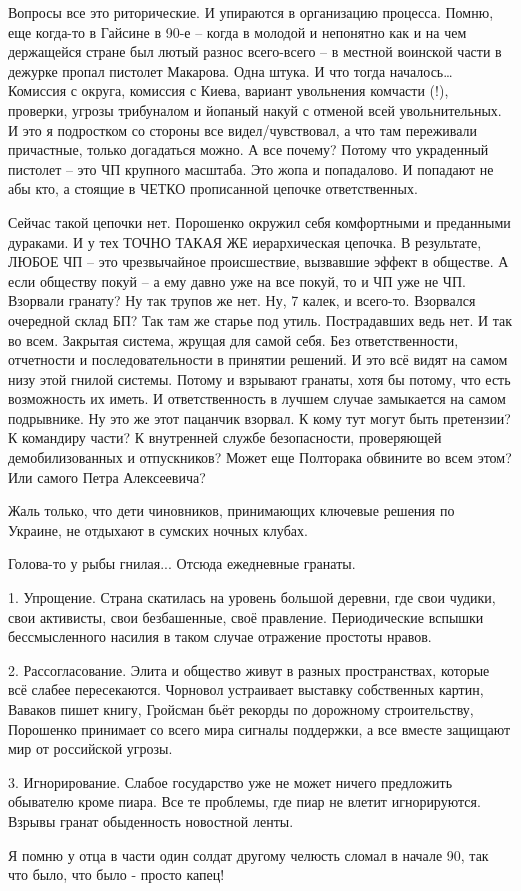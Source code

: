 Вопросы все это риторические. И упираются в организацию процесса. Помню, еще
когда-то в Гайсине в 90-е – когда в молодой и непонятно как и на чем держащейся
стране был лютый разнос всего-всего – в местной воинской части в дежурке пропал
пистолет Макарова. Одна штука. И что тогда началось… Комиссия с округа,
комиссия с Киева, вариант увольнения комчасти (!), проверки, угрозы трибуналом
и йопаный накуй с отменой всей увольнительных. И это я подростком со стороны
все видел/чувствовал, а что там переживали причастные, только догадаться можно.
А все почему? Потому что украденный пистолет – это ЧП крупного масштаба. Это
жопа и попадалово. И попадают не абы кто, а стоящие в ЧЕТКО прописанной цепочке
ответственных.

Сейчас такой цепочки нет. Порошенко окружил себя комфортными и преданными
дураками. И у тех ТОЧНО ТАКАЯ ЖЕ иерархическая цепочка. В результате, ЛЮБОЕ ЧП
– это чрезвычайное происшествие, вызвавшие эффект в обществе. А если обществу
покуй – а ему давно уже на все покуй, то и ЧП уже не ЧП. Взорвали гранату? Ну
так трупов же нет. Ну, 7 калек, и всего-то. Взорвался очередной склад БП? Так
там же старье под утиль. Пострадавших ведь нет. И так во всем. Закрытая
система, жрущая для самой себя. Без ответственности, отчетности и
последовательности в принятии решений. И это всё видят на самом низу этой
гнилой системы. Потому и взрывают гранаты, хотя бы потому, что есть возможность
их иметь. И ответственность в лучшем случае замыкается на самом подрывнике. Ну
это же этот пацанчик взорвал. К кому тут могут быть претензии? К командиру
части? К внутренней службе безопасности, проверяющей демобилизованных и
отпускников? Может еще Полторака обвините во всем этом? Или самого Петра
Алексеевича?

Жаль только, что дети чиновников, принимающих ключевые решения по Украине, не
отдыхают в сумских ночных клубах.

\begin{itemize} %

Голова-то у рыбы гнилая... Отсюда ежедневные гранаты.


1. Упрощение. Страна скатилась на уровень большой деревни, где свои чудики,
свои активисты, свои безбашенные, своё правление. Периодические вспышки
бессмысленного насилия в таком случае отражение простоты нравов. 

2.  Рассогласование. Элита и общество живут в разных пространствах, которые всё
слабее пересекаются. Чорновол устраивает выставку собственных картин, Ваваков
пишет книгу, Гройсман бьёт рекорды по дорожному строительству, Порошенко
принимает со всего мира сигналы поддержки, а все вместе защищают мир от
российской угрозы. 

3. Игнорирование. Слабое государство уже не может ничего предложить обывателю
кроме пиара. Все те проблемы, где пиар не влетит игнорируются. Взрывы гранат
обыденность новостной ленты.


Я помню у отца в части один солдат другому челюсть сломал в начале 90, так что
было, что было - просто капец!

\end{itemize} %
